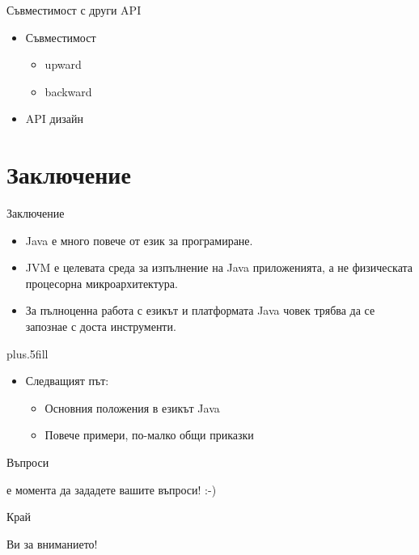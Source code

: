 \documentclass{beamer}
\begin{document}
\begin{frame}{Съвместимост с други API}
  \transdissolve
  \begin{itemize}
  \item Съвместимост
    \begin{itemize}
      \item upward
      \item backward
    \end{itemize}
    \item API дизайн
  \end{itemize}
\end{frame}


\section*{Заключение}

\begin{frame}{Заключение}
  \transdissolve
  \begin{itemize}
  \item
    Java \alert{е много повече от език за програмиране}.
  \item
    JVM \alert{е целевата среда за изпълнение} на Java приложенията, а
    не физическата процесорна микроархитектура.
  \item
    За пълноценна работа с езикът и платформата Java човек трябва да
    се запознае с доста инструменти.
  \end{itemize}
  
  \vskip0pt plus.5fill
  \begin{itemize}
  \item
    Следващият път:
    \begin{itemize}
    \item
      Основния положения в езикът Java
    \item
      Повече примери, по-малко общи приказки
    \end{itemize}
  \end{itemize}
\end{frame}

\begin{frame}{Въпроси}
  \transdissolve
  \begin{center}
     е момента да зададете вашите въпроси! :-)
  \end{center}
\end{frame}

\begin{frame}{Край}
  \transdissolve
  \begin{center}
     Ви за вниманието!
  \end{center}
\end{frame}
\end{document}

